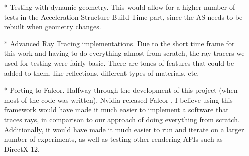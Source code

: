 \begin{itemize}
  \item[*]{Testing with dynamic geometry. This would allow for a higher number of tests in the Acceleration Structure Build Time part, since the AS needs to be rebuilt when geometry changes.}
  \item[*]{Advanced Ray Tracing implementations. Due to the short time frame for this work and having to do everything almost from scratch, the ray tracers we used for testing were fairly basic. There are tones of features that could be added to them, like reflections, different types of materials, etc.}
  \item[*]{Porting to Falcor. Halfway through the development of this project (when most of the code was written), Nvidia released Falcor \cite{Kallweit22}. I believe using this framework would have made it much easier to implement a software that traces rays, in comparison to our approach of doing everything from scratch. Additionally, it would have made it much easier to run and iterate on a larger number of experiments, as well as testing other rendering APIs such as DirectX 12.}
\end{itemize}

